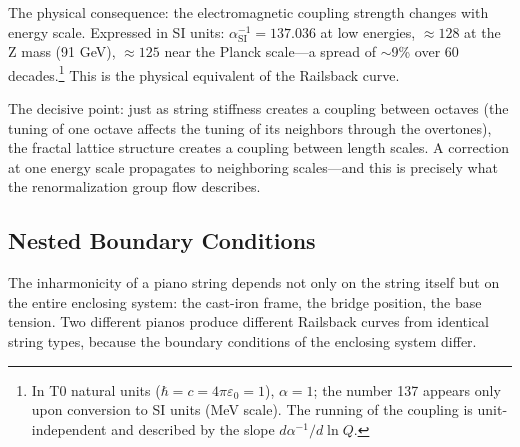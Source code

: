 The physical consequence: the electromagnetic coupling strength changes with energy scale. Expressed in SI units: $\alpha_\text{SI}^{-1} = 137.036$ at low energies, $\approx 128$ at the Z mass (91 GeV), $\approx 125$ near the Planck scale---a spread of $\sim$9\% over 60 decades.\footnote{In T0 natural units ($\hbar = c = 4\pi\varepsilon_0 = 1$), $\alpha = 1$; the number 137 appears only upon conversion to SI units (MeV scale). The running of the coupling is unit-independent and described by the slope $d\alpha^{-1}/d\ln Q$.} This is the physical equivalent of the Railsback curve.

\begin{table}[h]
\centering
{}
\caption{Inharmonicity of a stiff string and renormalization group flow on the fractal torus.}
\label{tab:inharmonicity}
\end{table}

The decisive point: just as string stiffness creates a coupling between octaves (the tuning of one octave affects the tuning of its neighbors through the overtones), the fractal lattice structure creates a coupling between length scales. A correction at one energy scale propagates to neighboring scales---and this is precisely what the renormalization group flow describes.

\subsection{Nested Boundary Conditions}

The inharmonicity of a piano string depends not only on the string itself but on the entire enclosing system: the cast-iron frame, the bridge position, the base tension. Two different pianos produce different Railsback curves from identical string types, because the boundary conditions of the enclosing system differ.

